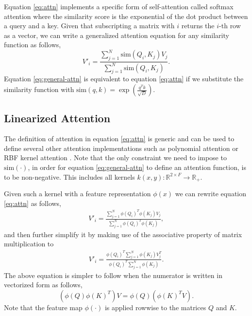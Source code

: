 \documentclass{article}
\newcommand{\R}[1]{\mathbb{R}^{#1}}
\newcommand{\e}[1]{\exp\left(#1\right)}
\newcommand{\similarity}[1]{\text{sim}\left(#1\right)}
\newcommand{\fe}[1]{\phi\left(#1\right)}
\begin{document}
Equation \ref{eq:attn} implements a specific form of self-attention called
softmax attention where the similarity score is the exponential of the dot
product between a query and a key. Given that subscripting a matrix with $i$
returns the $i$-th row as a vector, we can write a generalized attention
equation for any similarity function as follows,
\begin{equation}
    V'_i = \frac{\sum_{j=1}^N \similarity{Q_i, K_j} V_j}
                {\sum_{j=1}^N \similarity{Q_i, K_j}}.
    \label{eq:general-attn}
\end{equation}
Equation \ref{eq:general-attn} is equivalent to equation \ref{eq:attn} if we
substitute the similarity function with $\similarity{q, k} = \e{\frac{q^T
k}{\sqrt{D}}}$.

\subsection{Linearized Attention} \label{sec:method-linear}

The definition of attention in equation \ref{eq:attn} is generic and can be
used to define several other attention implementations such as polynomial
attention or RBF kernel attention \cite{tsai2019transformer}. Note that the
only constraint we need to impose to $\similarity{\cdot}$, in order for
equation \ref{eq:general-attn} to define an attention function, is to be
non-negative. This includes all kernels $k(x, y) : \R{2 \times F} \to \R{}_+$.

Given such a kernel with a feature representation $\fe{x}$ we can rewrite
equation \ref{eq:attn} as follows,
\begin{align}
    V'_i = \frac{\sum_{j=1}^N \fe{Q_i}^T \fe{K_j} V_j}
                 {\sum_{j=1}^N \fe{Q_i}^T \fe{K_j}},
\end{align}
and then further simplify it by making use of the associative property of
matrix multiplication to
\begin{align}
     V'_i = \frac{\fe{Q_i}^T \sum_{j=1}^N \fe{K_j} V_j^T}
             {\fe{Q_i}^T \sum_{j=1}^N \fe{K_j}}.
    \label{eq:linear_attn}
\end{align}
The above equation is simpler to follow when the numerator is written in
vectorized form as follows,
\begin{equation}
    \left(\fe{Q} \fe{K}^T\right) V = \fe{Q} \left(\fe{K}^T V\right).
\end{equation}
Note that the feature map $\fe{\cdot}$ is applied rowwise to
the matrices $Q$ and $K$.
\end{document}

